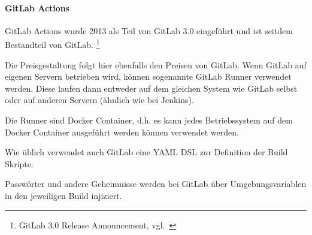 \paragraph{GitLab Actions}\label{ci_services_tools_gitlab_actions}

GitLab Actions wurde 2013 als Teil von GitLab 3.0 eingeführt und ist seitdem Bestandteil von GitLab. \footnote{GitLab 3.0 Release Announcement, vgl.~\cite{GITLAB_ACTIONS}}

Die Preisgestaltung folgt hier ebenfalls den Preisen von GitLab.
Wenn GitLab auf eigenen Servern betrieben wird, können sogenannte GitLab Runner verwendet werden.
Diese laufen dann entweder auf dem gleichen System wie GitLab selbst oder auf anderen Servern (ähnlich wie bei Jenkins).

Die Runner sind Docker Container, d.h. es kann jedes Betriebssystem auf dem Docker Container ausgeführt werden können verwendet werden.

Wie üblich verwendet auch GitLab eine YAML DSL zur Definition der Build Skripte.

Passwörter und andere Geheimnisse werden bei GitLab über Umgebungsvariablen in den jeweiligen Build injiziert.
